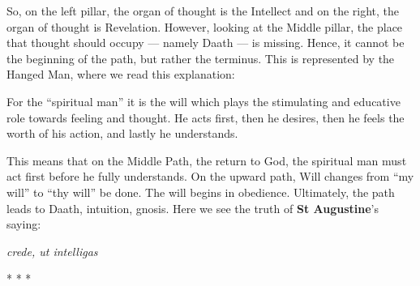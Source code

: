 So, on the left pillar, the organ of thought is the Intellect and on the right, the organ of thought is Revelation. However, looking at the Middle pillar, the place that thought should occupy --- namely Daath --- is missing. Hence, it cannot be the beginning of the path, but rather the terminus. This is represented by the Hanged Man, where we read this explanation:

\begin{quotex}
For the ``spiritual man'' it is the will which plays the stimulating and educative role towards feeling and thought. He acts first, then he desires, then he feels the worth of his action, and lastly he understands.
\end{quotex}


This means that on the Middle Path, the return to God, the spiritual man must act first before he fully understands. On the upward path, Will changes from ``my will'' to ``thy will'' be done. The will begins in obedience. Ultimately, the path leads to Daath, intuition, gnosis. Here we see the truth of \textbf{St Augustine}'s saying:

\textit{crede, ut intelligas}



\begin{center}* * *\end{center}

